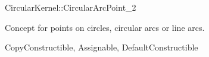 \begin{ccRefConcept}{CircularKernel::CircularArcPoint_2}

\ccDefinition

Concept for points on circles, circular arcs or line arcs. 

\ccRefines
CopyConstructible, Assignable, DefaultConstructible

\ccHasModels
{}

\end{ccRefConcept}

